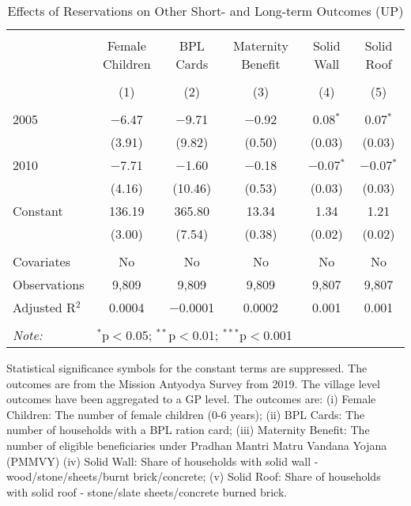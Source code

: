 \begin{table}[!htbp]
\centering
\begin{threeparttable}

  \caption{Effects of Reservations on Other Short- and Long-term Outcomes (UP)} 
  \label{up_shrug_other_05_10} 
\scriptsize 
\begin{tabular}{@{\extracolsep{0pt}}lccccc} 
\\[-1.8ex]\hline 
\hline \\[-1.8ex] 
 & Female Children & BPL Cards & Maternity Benefit & Solid Wall & Solid Roof \\ 
\\[-1.8ex] & (1) & (2) & (3) & (4) & (5)\\ 
\hline \\[-1.8ex] 
 2005 & $-$6.47 & $-$9.71 & $-$0.92 & 0.08$^{*}$ & 0.07$^{*}$ \\ 
  & (3.91) & (9.82) & (0.50) & (0.03) & (0.03) \\ 
  2010 & $-$7.71 & $-$1.60 & $-$0.18 & $-$0.07$^{*}$ & $-$0.07$^{*}$ \\ 
  & (4.16) & (10.46) & (0.53) & (0.03) & (0.03) \\ 
  Constant & 136.19 & 365.80 & 13.34 & 1.34 & 1.21 \\ 
  & (3.00) & (7.54) & (0.38) & (0.02) & (0.02) \\ 
 \hline \\[-1.8ex] 
Covariates & No & No & No & No & No \\ 
Observations & 9,809 & 9,809 & 9,809 & 9,807 & 9,807 \\ 
Adjusted R$^{2}$ & 0.0004 & $-$0.0001 & 0.0002 & 0.001 & 0.001 \\ 
\hline 
\hline \\[-1.8ex] 
\textit{Note:}  & \multicolumn{5}{l}{$^{*}$p$<$0.05; $^{**}$p$<$0.01; $^{***}$p$<$0.001} \\ 
\end{tabular} 
\begin{tablenotes}[flushleft]
\scriptsize
\item Statistical significance symbols for the constant terms are suppressed. The outcomes are from the Mission Antyodya Survey from 2019. 
                   The village level outcomes have been aggregated to a GP level. The outcomes are: 
                     (i) Female Children: The number of female children (0-6 years);
                     (ii) BPL Cards: The number of households with a BPL ration card;
                     (iii) Maternity Benefit: The number of eligible beneficiaries under Pradhan Mantri Matru Vandana Yojana (PMMVY)
                     (iv) Solid Wall: Share of households with solid wall - wood/stone/sheets/burnt brick/concrete;
                     (v) Solid Roof: Share of households with solid roof - stone/slate sheets/concrete burned brick.
\end{tablenotes}
\end{threeparttable}
\end{table}
